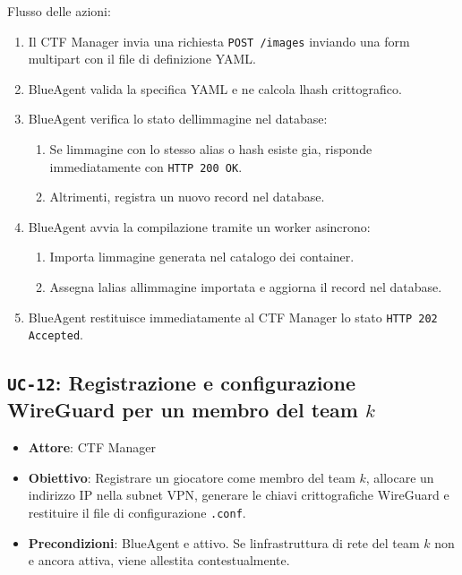 Flusso delle azioni:

\begin{enumerate}
\def\labelenumi{\arabic{enumi}.}
\tightlist
\item
  Il CTF Manager invia una richiesta
  \passthrough{\lstinline!POST /images!} inviando una form multipart con
  il file di definizione YAML.
\item
  BlueAgent valida la specifica YAML e ne calcola l\textquotesingle hash
  crittografico.
\item
  BlueAgent verifica lo stato dell\textquotesingle immagine nel
  database:

  \begin{enumerate}
  \def\labelenumii{\arabic{enumii}.}
  \tightlist
  \item
    Se l\textquotesingle immagine con lo stesso alias o hash esiste gia,
    risponde immediatamente con \passthrough{\lstinline!HTTP 200 OK!}.
  \item
    Altrimenti, registra un nuovo record nel database.
  \end{enumerate}
\item
  BlueAgent avvia la compilazione tramite un worker asincrono:

  \begin{enumerate}
  \def\labelenumii{\arabic{enumii}.}
  \tightlist
  \item
    Importa l\textquotesingle immagine generata nel catalogo dei
    container.
  \item
    Assegna l\textquotesingle alias all\textquotesingle immagine
    importata e aggiorna il record nel database.
  \end{enumerate}
\item
  BlueAgent restituisce immediatamente al CTF Manager lo stato
  \passthrough{\lstinline!HTTP 202 Accepted!}.
\end{enumerate}

\subsection{\texorpdfstring{\texttt{UC-12}: Registrazione e
configurazione WireGuard per un membro del team
\(k\)}{UC-12: Registrazione e configurazione WireGuard per un membro del team k}}\label{uc-12-registrazione-e-configurazione-wireguard-per-un-membro-del-team-k}

\begin{itemize}
\tightlist
\item
  \textbf{Attore}: CTF Manager
\item
  \textbf{Obiettivo}: Registrare un giocatore come membro del team
  \(k\), allocare un indirizzo IP nella subnet VPN, generare le chiavi
  crittografiche WireGuard e restituire il file di configurazione
  \passthrough{\lstinline!.conf!}.
\item
  \textbf{Precondizioni}: BlueAgent e\textquotesingle{} attivo. Se
  l\textquotesingle infrastruttura di rete del team \(k\) non
  e\textquotesingle{} ancora attiva, viene allestita contestualmente.
\end{itemize}

